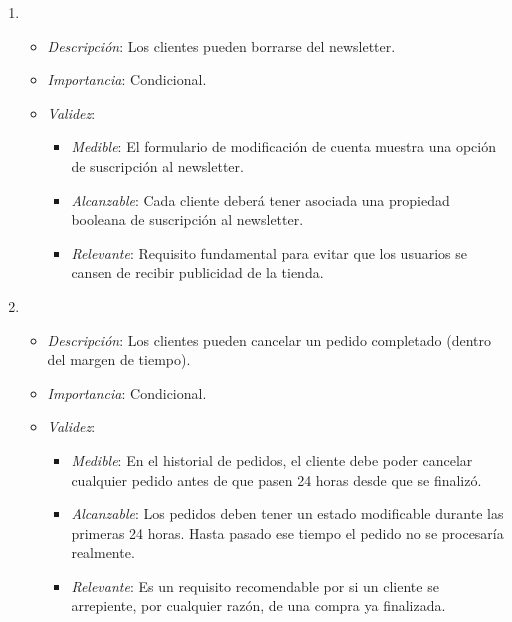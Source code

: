 \begin{enumerate}[{\bf RF-1}]
\item 
  \begin{itemize}
  \item \textit{Descripción}: Los clientes pueden borrarse del newsletter.
  \item \textit{Importancia}: Condicional.
  \item \textit{Validez}: 
    \begin{itemize}
    \item \textit{Medible}: El formulario de modificación de cuenta muestra una opción de suscripción al newsletter.
    \item \textit{Alcanzable}: Cada cliente deberá tener asociada una propiedad booleana de suscripción al newsletter.
    \item \textit{Relevante}: Requisito fundamental para evitar que los usuarios se cansen de recibir publicidad de la tienda.
    \end{itemize}
  \end{itemize}


\item 
  \begin{itemize}
  \item \textit{Descripción}: Los clientes pueden cancelar un pedido completado (dentro del margen de tiempo).
  \item \textit{Importancia}: Condicional.
  \item \textit{Validez}:
    \begin{itemize}
    \item \textit{Medible}: En el historial de pedidos, el cliente debe poder cancelar cualquier pedido antes de que pasen 24 horas desde que se finalizó.
    \item \textit{Alcanzable}: Los pedidos deben tener un estado modificable durante las primeras 24 horas. Hasta pasado ese tiempo el pedido no se procesaría realmente.
    \item \textit{Relevante}: Es un requisito recomendable por si un cliente se arrepiente, por cualquier razón, de una compra ya finalizada.
    \end{itemize}
  \end{itemize}


\end{enumerate}
